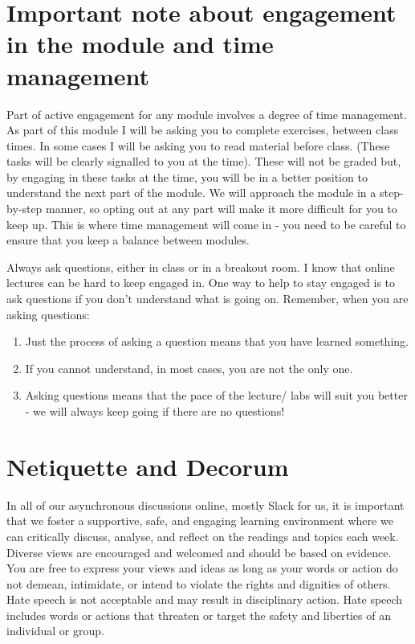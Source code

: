\documentclass{article}
\begin{document}
\pagebreak
\section{Important note about engagement in the module  and time management}
 Part of active engagement  for any module involves a degree of time management. 
 As part of this module I will be asking you to complete exercises, between class times. In some cases I will be asking you to read material before class. 
 (These tasks will be clearly signalled to you at the time). These will not be graded but, by engaging in these tasks at the time, you will be in a better position to 
 understand the next part of the module. We will approach the module in a step-by-step manner, so opting out at any part will make it more difficult for you to keep up. 
 This is where time management will come in - you need to be careful to ensure that you keep a balance between modules. 
 
 Always ask questions, either in class or in a breakout room. I know that online lectures can be hard to keep engaged in. One way to help to stay engaged is to ask questions if you don't understand what is going on. 
 Remember, when you are asking questions:
 \begin{enumerate}
    \item Just the process of asking a question means that you have learned something. 
    \item If you cannot understand, in most cases, you are not the only one. 
    \item Asking questions means that the pace of the lecture/ labs will suit you better - we will always keep going if there are no questions! 
 \end{enumerate}

 \section{Netiquette and Decorum}
 In all of our asynchronous discussions online, mostly Slack for us,  it is important that we foster a supportive, safe, 
 and engaging learning environment where we can critically discuss, analyse, and reflect on the 
 readings and topics each week. Diverse views are encouraged and welcomed and should be based on evidence. 
 You are free to express your views and ideas as long as your words or action do not demean, intimidate, or intend
  to violate the rights and dignities of others. Hate speech is not acceptable and may result in disciplinary action. 
 Hate speech includes words or actions that threaten or target the safety and liberties of an individual or group.
   
\end{document}
